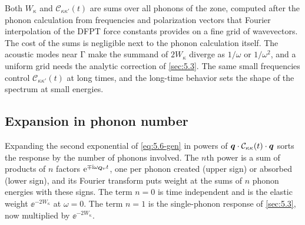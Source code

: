 Both $W_\kappa$ and $\mathcal{C}_{\kappa\kappa'}(t)$ are sums over all phonons of the zone, computed after the phonon calculation from frequencies and polarization vectors that Fourier interpolation of the DFPT force constants provides on a fine grid of wavevectors. The cost of the sums is negligible next to the phonon calculation itself. The acoustic modes near $\mathrm{\Gamma}$ make the summand of $2W_\kappa$ diverge as $1/\omega$ or $1/\omega^2$, and a uniform grid needs the analytic correction of \cref{sec:5.3}. The same small frequencies control $\mathcal{C}_{\kappa\kappa'}(t)$ at long times, and the long-time behavior sets the shape of the spectrum at small energies.

\subsection{Expansion in phonon number}

Expanding the second exponential of \cref{eq:5.6-gen} in powers of $\bm{q}\cdot\mathcal{C}_{\kappa\kappa}(t)\cdot\bm{q}$ sorts the response by the number of phonons involved. The $n$th power is a sum of products of $n$ factors $\mathrm{e}^{\mp\mathrm{i}\omega_{\bm{Q}\nu}t}$, one per phonon created (upper sign) or absorbed (lower sign), and its Fourier transform puts weight at the sums of $n$ phonon energies with these signs. The term $n = 0$ is time independent and is the elastic weight $\ee^{-2W_\kappa}$ at $\omega = 0$. The term $n = 1$ is the single-phonon response of \cref{sec:5.3}, now multiplied by $\ee^{-2W_\kappa}$.

